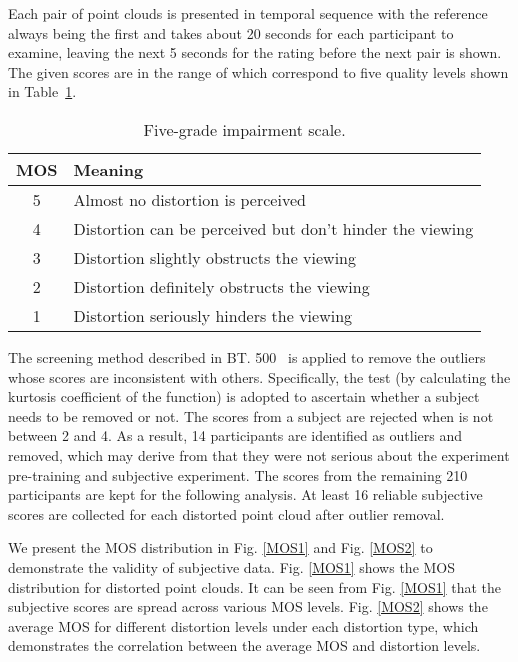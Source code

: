 \documentclass[acmsmall]{acmart}
\begin{document}
\par Each pair of point clouds is presented in temporal sequence with the reference always being the first and takes about 20 seconds for each participant to examine, leaving the next 5 seconds for the rating before the next pair is shown. The given scores are in the range of  which correspond to five quality levels shown in Table~\ref{Score}.

\begin{table}[htbp]
  \centering
  \caption{Five-grade impairment scale.}
  \begin{footnotesize}
    \begin{tabular}{c|l}
    \hline
    MOS     & Meaning \\
    \hline
    5     & Almost no distortion is perceived \\
    \hline
    4     & Distortion can be perceived but don't hinder the viewing \\
    \hline
    3     & Distortion slightly obstructs the viewing \\
    \hline
    2     & Distortion definitely obstructs the viewing \\
    \hline
    1     & Distortion seriously hinders the viewing \\
    \hline
    \end{tabular}\end{footnotesize}
  \label{Score}\end{table}

\par The screening method described in BT. 500~\cite{BT500} is applied to remove the outliers whose scores are inconsistent with others. Specifically, the  test (by calculating the kurtosis coefficient of the function) is adopted to ascertain whether a subject needs to be removed or not. The scores from a subject are rejected when  is not between 2 and 4. As a result, 14 participants are identified as outliers and removed, which may derive from that they were not serious about the experiment pre-training and subjective experiment. The scores from the remaining 210 participants are kept for the following analysis. At least 16 reliable subjective scores are collected for each distorted point cloud after outlier removal.

\par We present the MOS distribution in Fig. \ref{MOS1} and Fig. \ref{MOS2} to demonstrate the validity of subjective data. Fig. \ref{MOS1} shows the MOS distribution for distorted point clouds. It can be seen from Fig. \ref{MOS1} that the subjective scores are spread across various MOS levels. Fig. \ref{MOS2} shows the average MOS for different distortion levels under each distortion type, which demonstrates the correlation between the average MOS and distortion levels.
\end{document}
